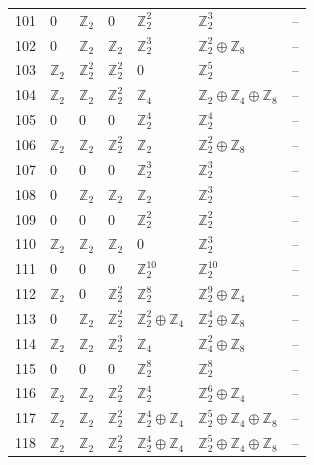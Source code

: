 \documentclass[10pt]{article}
\begin{document}
\begin{longtable}{rlllllr}
101 & $0$ & $\mathbb{Z}_{2}$ & $0$ & $\mathbb{Z}_{2}^{2}$ & $\mathbb{Z}_{2}^{3}$ & -- \\
102 & $0$ & $\mathbb{Z}_{2}$ & $\mathbb{Z}_{2}$ & $\mathbb{Z}_{2}^{3}$ & $\mathbb{Z}_{2}^{2}\oplus \mathbb{Z}_{8}$ & -- \\
103 & $\mathbb{Z}_{2}$ & $\mathbb{Z}_{2}^{2}$ & $\mathbb{Z}_{2}^{2}$ & $0$ & $\mathbb{Z}_{2}^{5}$ & -- \\
104 & $\mathbb{Z}_{2}$ & $\mathbb{Z}_{2}$ & $\mathbb{Z}_{2}^{2}$ & $\mathbb{Z}_{4}$ & $\mathbb{Z}_{2}\oplus \mathbb{Z}_{4}\oplus \mathbb{Z}_{8}$ & -- \\
105 & $0$ & $0$ & $0$ & $\mathbb{Z}_{2}^{4}$ & $\mathbb{Z}_{2}^{4}$ & -- \\
106 & $\mathbb{Z}_{2}$ & $\mathbb{Z}_{2}$ & $\mathbb{Z}_{2}^{2}$ & $\mathbb{Z}_{2}$ & $\mathbb{Z}_{2}^{2}\oplus \mathbb{Z}_{8}$ & -- \\
107 & $0$ & $0$ & $0$ & $\mathbb{Z}_{2}^{3}$ & $\mathbb{Z}_{2}^{3}$ & -- \\
108 & $0$ & $\mathbb{Z}_{2}$ & $\mathbb{Z}_{2}$ & $\mathbb{Z}_{2}$ & $\mathbb{Z}_{2}^{3}$ & -- \\
109 & $0$ & $0$ & $0$ & $\mathbb{Z}_{2}^{2}$ & $\mathbb{Z}_{2}^{2}$ & -- \\
110 & $\mathbb{Z}_{2}$ & $\mathbb{Z}_{2}$ & $\mathbb{Z}_{2}$ & $0$ & $\mathbb{Z}_{2}^{3}$ & -- \\
111 & $0$ & $0$ & $0$ & $\mathbb{Z}_{2}^{10}$ & $\mathbb{Z}_{2}^{10}$ & -- \\
112 & $\mathbb{Z}_{2}$ & $0$ & $\mathbb{Z}_{2}^{2}$ & $\mathbb{Z}_{2}^{8}$ & $\mathbb{Z}_{2}^{9}\oplus \mathbb{Z}_{4}$ & -- \\
113 & $0$ & $\mathbb{Z}_{2}$ & $\mathbb{Z}_{2}^{2}$ & $\mathbb{Z}_{2}^{2}\oplus \mathbb{Z}_{4}$ & $\mathbb{Z}_{2}^{4}\oplus \mathbb{Z}_{8}$ & -- \\
114 & $\mathbb{Z}_{2}$ & $\mathbb{Z}_{2}$ & $\mathbb{Z}_{2}^{3}$ & $\mathbb{Z}_{4}$ & $\mathbb{Z}_{4}^{2}\oplus \mathbb{Z}_{8}$ & -- \\
115 & $0$ & $0$ & $0$ & $\mathbb{Z}_{2}^{8}$ & $\mathbb{Z}_{2}^{8}$ & -- \\
116 & $\mathbb{Z}_{2}$ & $\mathbb{Z}_{2}$ & $\mathbb{Z}_{2}^{2}$ & $\mathbb{Z}_{2}^{4}$ & $\mathbb{Z}_{2}^{6}\oplus \mathbb{Z}_{4}$ & -- \\
117 & $\mathbb{Z}_{2}$ & $\mathbb{Z}_{2}$ & $\mathbb{Z}_{2}^{2}$ & $\mathbb{Z}_{2}^{4}\oplus \mathbb{Z}_{4}$ & $\mathbb{Z}_{2}^{5}\oplus \mathbb{Z}_{4}\oplus \mathbb{Z}_{8}$ & -- \\
118 & $\mathbb{Z}_{2}$ & $\mathbb{Z}_{2}$ & $\mathbb{Z}_{2}^{2}$ & $\mathbb{Z}_{2}^{4}\oplus \mathbb{Z}_{4}$ & $\mathbb{Z}_{2}^{5}\oplus \mathbb{Z}_{4}\oplus \mathbb{Z}_{8}$ & -- \\

\end{longtable}
\end{document}
